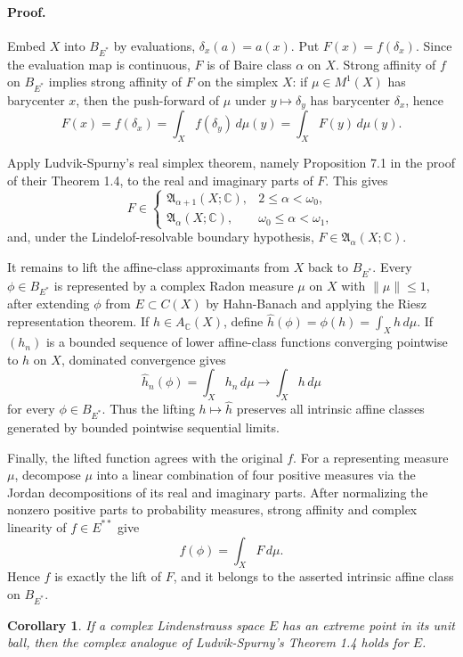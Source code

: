 \documentclass[11pt]{article}
\newtheorem*{corollary}{Corollary}
\newcommand{\A}{\mathfrak A}
\begin{document}
\paragraph{Proof.}
Embed \(X\) into \(B_{E^*}\) by evaluations, \(\delta_x(a)=a(x)\). Put
\(F(x)=f(\delta_x)\). Since the evaluation map is continuous, \(F\) is of Baire
class \(\alpha\) on \(X\). Strong affinity of \(f\) on \(B_{E^*}\) implies
strong affinity of \(F\) on the simplex \(X\): if \(\mu\in M^1(X)\) has
barycenter \(x\), then the push-forward of \(\mu\) under \(y\mapsto\delta_y\)
has barycenter \(\delta_x\), hence
\[
F(x)=f(\delta_x)=\int_X f(\delta_y)\,d\mu(y)=\int_X F(y)\,d\mu(y).
\]

Apply Ludvik-Spurny's real simplex theorem, namely Proposition 7.1 in the proof
of their Theorem 1.4, to the real and imaginary parts of \(F\). This gives
\[
F\in
\begin{cases}
\A_{\alpha+1}(X;\mathbb C), & 2\leq \alpha<\omega_0,\\
\A_{\alpha}(X;\mathbb C), & \omega_0\leq \alpha<\omega_1,
\end{cases}
\]
and, under the Lindelof-resolvable boundary hypothesis, \(F\in\A_\alpha(X;\mathbb C)\).

It remains to lift the affine-class approximants from \(X\) back to \(B_{E^*}\).
Every \(\phi\in B_{E^*}\) is represented by a complex Radon measure \(\mu\) on
\(X\) with \(\|\mu\|\leq 1\), after extending \(\phi\) from \(E\subset C(X)\)
by Hahn-Banach and applying the Riesz representation theorem. If \(h\in
A_{\mathbb C}(X)\), define \(\widehat h(\phi)=\phi(h)=\int_X h\,d\mu\). If
\((h_n)\) is a bounded sequence of lower affine-class functions converging
pointwise to \(h\) on \(X\), dominated convergence gives
\[
\widehat h_n(\phi)=\int_X h_n\,d\mu \longrightarrow \int_X h\,d\mu
\]
for every \(\phi\in B_{E^*}\). Thus the lifting \(h\mapsto \widehat h\)
preserves all intrinsic affine classes generated by bounded pointwise sequential
limits.

Finally, the lifted function agrees with the original \(f\). For a representing
measure \(\mu\), decompose \(\mu\) into a linear combination of four positive
measures via the Jordan decompositions of its real and imaginary parts. After
normalizing the nonzero positive parts to probability measures, strong affinity
and complex linearity of \(f\in E^{**}\) give
\[
f(\phi)=\int_X F\,d\mu.
\]
Hence \(f\) is exactly the lift of \(F\), and it belongs to the asserted
intrinsic affine class on \(B_{E^*}\).

\begin{corollary}
If a complex Lindenstrauss space \(E\) has an extreme point in its unit ball,
then the complex analogue of Ludvik-Spurny's Theorem 1.4 holds for \(E\).
\end{corollary}
\end{document}
